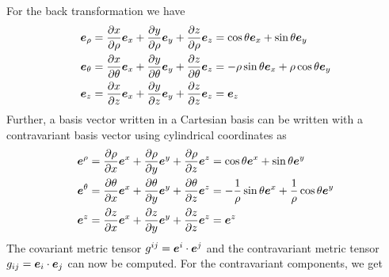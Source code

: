 %
For the back transformation we have
%
\begin{align*}
    \ve{e}_\rho
    &=
    \parti{x}{\rho} \ve{e}_{x}
    + \parti{y}{\rho} \ve{e}_{y}
    + \parti{z}{\rho} \ve{e}_{z}
    =
    \cos\theta \ve{e}_x
    + \sin\theta \ve{e}_y
    \\
%
%
    \ve{e}_\theta
    &=
    \parti{x}{\theta} \ve{e}_{x}
    + \parti{y}{\theta} \ve{e}_{y}
    + \parti{z}{\theta} \ve{e}_{z}
    =
    -\rho\sin\theta \ve{e}_x
    + \rho\cos\theta \ve{e}_y
    \\
%
%
    \ve{e}_z
    &=
    \parti{x}{z} \ve{e}_{x}
    + \parti{y}{z} \ve{e}_{y}
    + \parti{z}{z} \ve{e}_{z}
    =
    \ve{e}_z
\end{align*}
%
Further, a basis vector written in a Cartesian basis can be written with a contravariant basis vector using cylindrical coordinates as
%
\begin{align*}
    \ve{e}^\rho
    &=
    \parti{\rho}{x} \ve{e}^{x}
    + \parti{\rho}{y} \ve{e}^{y}
    + \parti{\rho}{z} \ve{e}^{z}
    =
    \cos\theta \ve{e}^x
    + \sin\theta \ve{e}^y
    \\
%
%
    \ve{e}^\theta
    &=
    \parti{\theta}{x} \ve{e}^{x}
    + \parti{\theta}{y} \ve{e}^{y}
    + \parti{\theta}{z} \ve{e}^{z}
    =
    -\frac{1}{\rho}\sin\theta \ve{e}^x
    + \frac{1}{\rho} \cos\theta \ve{e}^y
    \\
%
%
    \ve{e}^z
    &=
    \parti{z}{x} \ve{e}^{x}
    + \parti{z}{y} \ve{e}^{y}
    + \parti{z}{z} \ve{e}^{z}
    =
    \ve{e}^z
\end{align*}
%
The covariant metric tensor $g^{ij}=\boldsymbol{e}^i\cdot\boldsymbol{e}^j$ and the contravariant metric tensor $g_{ij}=\boldsymbol{e}_i\cdot\boldsymbol{e}_j$ can now be computed.
For the contravariant components, we get
%
